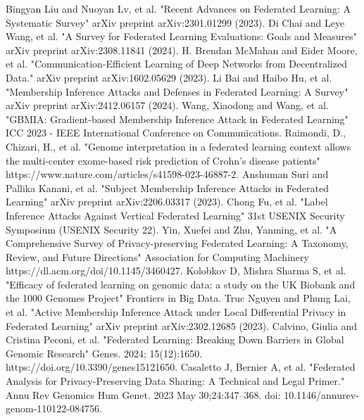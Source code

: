 \documentclass[conference]{IEEEtran}
\begin{document}
\begin{thebibliography}{00}
 Bingyan Liu and Nuoyan Lv, et al. "Recent Advances on Federated Learning: A Systematic Survey" arXiv preprint arXiv:2301.01299 (2023).
 Di Chai and Leye Wang, et al. "A Survey for Federated Learning Evaluations: Goals and Measures" arXiv preprint arXiv:2308.11841 (2024).
 H. Brendan McMahan and Eider Moore, et al. "Communication-Efficient Learning of Deep Networks from Decentralized Data." arXiv preprint arXiv:1602.05629 (2023).
 Li Bai and Haibo Hu, et al. "Membership Inference Attacks and Defenses in Federated Learning: A Survey" arXiv preprint arXiv:2412.06157 (2024).
 Wang, Xiaodong and Wang, et al. "GBMIA: Gradient-based Membership Inference Attack in Federated Learning" ICC 2023 - IEEE International Conference on Communications.
 Raimondi, D., Chizari, H., et al. "Genome interpretation in a federated learning context allows the multi-center exome-based risk prediction of Crohn’s disease patients" https://www.nature.com/articles/s41598-023-46887-2.
 Anshuman Suri and Pallika Kanani, et al. "Subject Membership Inference Attacks in Federated Learning" arXiv preprint arXiv:2206.03317 (2023).
 Chong Fu, et al. "Label Inference Attacks Against Vertical Federated Learning" 31st USENIX Security Symposium (USENIX Security 22).
 Yin, Xuefei and Zhu, Yanming, et al. "A Comprehensive Survey of Privacy-preserving Federated Learning: A Taxonomy, Review, and Future Directions" Association for Computing Machinery https://dl.acm.org/doi/10.1145/3460427.  
 Kolobkov D, Mishra Sharma S, et al. "Efficacy of federated learning on genomic data: a study on the UK Biobank and the 1000 Genomes Project" Frontiers in Big Data.
 Truc Nguyen and Phung Lai, et al. "Active Membership Inference Attack under Local Differential Privacy in Federated Learning" arXiv preprint arXiv:2302.12685 (2023).
 Calvino, Giulia and Cristina Peconi, et al. "Federated Learning: Breaking Down Barriers in Global Genomic Research" Genes. 2024; 15(12):1650. https://doi.org/10.3390/genes15121650.
 Casaletto J, Bernier A, et al. "Federated Analysis for Privacy-Preserving Data Sharing: A Technical and Legal Primer." Annu Rev Genomics Hum Genet. 2023 May 30;24:347–368. doi: 10.1146/annurev-genom-110122-084756.

\end{thebibliography}
\end{document}
